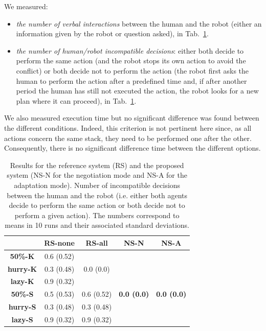 \documentclass[english,a4paper,11pt,twoside]{StyleThese}
\begin{document}
We measured:
\begin{itemize}
\item \textit{the number of verbal interactions} between the human and the robot (either an information given by the robot or question asked), in Tab.~\ref{tab:incompatible}.
\item \textit{the number of human/robot incompatible decisions}: either both decide to perform the same action (and the robot stops its own action to avoid the conflict) or both decide not to perform the action (the robot first asks the human to perform the action after a predefined time and, if after another period the human has still not executed the action, the robot looks for a new plan where it can proceed), in Tab.~\ref{tab:incompatible}.
\end{itemize}
We also measured execution time but no significant difference was found between the different conditions. Indeed, this criterion is not pertinent here since, as all actions concern the same stack, they need to be performed one after the other. Consequently, there is no significant difference time between the different options.

\begin{table}[!h]
\centering
  \begin{tabular}{|c||c|c|c|c|}
  \hline
     & \textbf{RS-none} & \textbf{RS-all} & \textbf{NS-N} & \textbf{NS-A} \\
  \hline
  \hline
     \textbf{50\%-K} & 0.6 (0.52) & & &  \\
  \cline{1-2}
     \textbf{hurry-K} & 0.3 (0.48) & 0.0 (0.0) & & \\
  \cline{1-2}
     \textbf{lazy-K} & 0.9 (0.32) &  &  &  \\
  \cline{1-3}
     \textbf{50\%-S} & 0.5 (0.53) & 0.6 (0.52) & \textbf{0.0 (0.0)} & \textbf{0.0 (0.0)} \\
  \cline{1-3}
     \textbf{hurry-S} & 0.3 (0.48) & 0.3 (0.48) &  &  \\
  \cline{1-3}
     \textbf{lazy-S} & 0.9 (0.32) & 0.9 (0.32) &  &  \\
  \hline
  \end{tabular}
   \caption{Results for the reference system (RS) and the proposed system (NS-N for the negotiation mode and NS-A for the adaptation mode). Number of incompatible decisions between the human and the robot (i.e. either both agents decide to perform the same action or both decide not to perform a given action). The numbers correspond to means in 10 runs and their associated standard deviations.}
   \label{tab:incompatible} 
\end{table}
\end{document}
